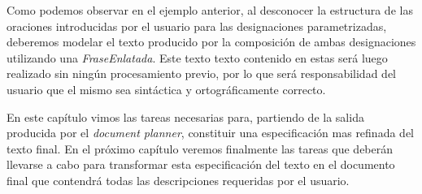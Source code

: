 Como podemos observar en el ejemplo anterior, al desconocer la estructura de las oraciones introducidas por el usuario para las designaciones parametrizadas, deberemos modelar el texto producido por la composición de ambas designaciones utilizando una \emph{FraseEnlatada}. Este texto texto contenido en estas será luego realizado sin ningún procesamiento previo, por lo que será responsabilidad del usuario que el mismo sea sintáctica y ortográficamente correcto.

\bigskip
En este capítulo vimos las tareas necesarias para, partiendo de la salida producida por el \textit{document planner}, constituir una especificación mas refinada del texto final. En el próximo capítulo veremos finalmente las tareas que deberán llevarse a cabo para transformar esta especificación del texto en el documento final que contendrá todas las descripciones requeridas por el usuario.


